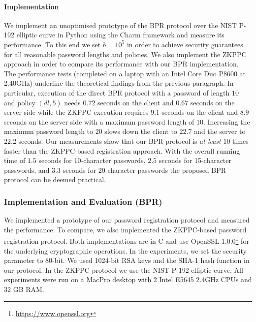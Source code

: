 \paragraph{Implementation}
We implement an unoptimised prototype of the \ac{BPR} protocol over the \ac{NIST} P-192 elliptic curve \cite{nistEC} in Python using the Charm framework \cite{charm13} and measure its performance.
To this end we set $b=10^5$ in order to achieve security guarantees for all reasonable password lengths and policies.
We also implement the \ac{ZKPPC} approach in order to compare its performance with our \ac{BPR} implementation.
The performance tests (completed on a laptop with an Intel Core Duo P8600 at 2.40GHz) underline the theoretical findings from the previous paragraph. 
In particular, execution of the direct \ac{BPR} protocol with a password of length $10$ and policy $(dl, 5)$ needs $0.72$ seconds on the client and $0.67$ seconds on the server side while the \ac{ZKPPC} execution requires $9.1$ seconds on the client and $8.9$ seconds on the server side with a maximum password length of $10$.
Increasing the maximum password length to $20$ slows down the client to $22.7$ and the server to $22.2$ seconds.
Our measurements show that our \ac{BPR} protocol is \emph{at least} $10$ times faster than the \ac{ZKPPC}-based registration approach.
With the overall running time of $1.5$ seconds for 10-character passwords, $2.5$ seconds for 15-character passwords, and $3.3$ seconds for 20-character passwords the proposed \ac{BPR} protocol can be deemed practical.

\subsubsection{Implementation and Evaluation (BPR)}\label{sec:evaluation}
We implemented a prototype of our password registration protocol and measured the performance. 
To compare, we also implemented the \ac{ZKPPC}-based password registration protocol. 
Both implementations are in C and use OpenSSL 1.0.0\footnote{\url{https://www.openssl.org}} for the underlying cryptographic operations. 
In the experiments, we set the security parameter to 80-bit. We used 1024-bit RSA keys and the \mbox{{SHA-}1} hash function in our protocol. 
In the \ac{ZKPPC} protocol we use the \ac{NIST} P-192 elliptic curve. 
All experiments were run on a MacPro desktop with 2 Intel E5645 2.4GHz CPUs and 32 GB RAM.

